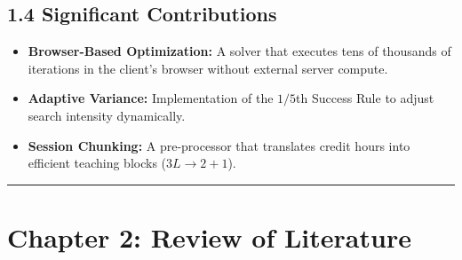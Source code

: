 \documentclass{article}
\begin{document}
\subsection*{1.4 Significant Contributions}
\begin{itemize}
    \item \textbf{Browser-Based Optimization:} A solver that executes tens of thousands of iterations in the client's browser without external server compute.
    \item \textbf{Adaptive Variance:} Implementation of the $1/5$th Success Rule to adjust search intensity dynamically.
    \item \textbf{Session Chunking:} A pre-processor that translates credit hours into efficient teaching blocks ($3L \rightarrow 2+1$).
\end{itemize}

\vspace{5mm}
\hrule
\vspace{5mm}

\section*{Chapter 2: Review of Literature}
\end{document}
